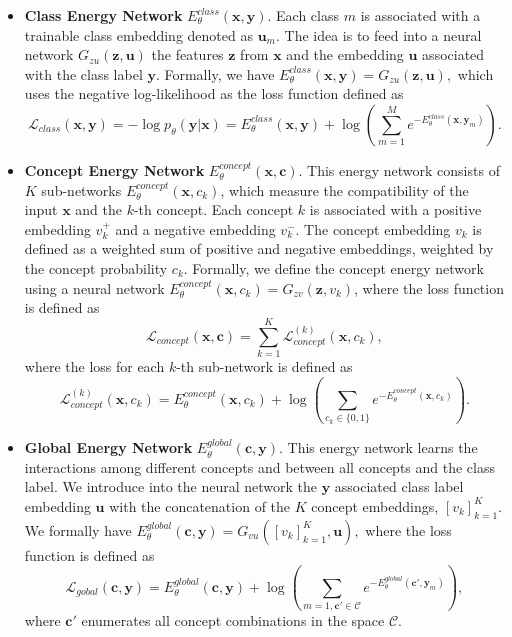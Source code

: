\begin{itemize}
    \item \textbf{Class Energy Network} $E_{\theta}^{class}(\mathbf{x},\mathbf{y})$. Each class $m$ is associated with a trainable class embedding denoted as $\mathbf{u}_m$. The idea is to feed into a neural network $G_{zu}(\mathbf{z},\mathbf{u})$ the features $\mathbf{z}$ from $\mathbf{x}$ and the embedding $\mathbf{u}$ associated with the class label $\mathbf{y}$. Formally, we have $E_{\theta}^{class}(\mathbf{x},\mathbf{y})=G_{zu}(\mathbf{z},\mathbf{u}),$ which uses the negative log-likelihood as the loss function defined as 
     \begin{equation}
         \mathcal{L}_{class}(\mathbf{x},\mathbf{y})=-\log p_{\theta}(\mathbf{y}|\mathbf{x})=E_{\theta}^{class}(\mathbf{x},\mathbf{y})+\log \left( \sum_{m=1}^M e^{-E_{\theta}^{class}(\mathbf{x},\mathbf{y}_m)} \right).
     \end{equation}
    \item \textbf{Concept Energy Network} $E_{\theta}^{concept}(\mathbf{x},\mathbf{c})$. This energy network consists of $K$ sub-networks $E_{\theta}^{concept}(\mathbf{x},c_k)$, which measure the compatibility of the input $\mathbf{x}$ and the $k$-th concept. Each concept $k$ is associated with a positive embedding $v_k^+$ and a negative embedding $v_k^-$. The concept embedding $v_k$ is defined as a weighted sum of positive and negative embeddings, weighted by the concept probability $c_k$. Formally, we define the concept energy network using a neural network $E_{\theta}^{concept}(\mathbf{x},c_k)=G_{zv}(\mathbf{z},v_k)$, where the loss function is defined as 
    \begin{equation}
        \mathcal{L}_{concept}(\mathbf{x},\mathbf{c})=\sum_{k=1}^K \mathcal{L}^{(k)}_{concept}(\mathbf{x},c_k),
    \end{equation}
    where the loss for each $k$-th sub-network is defined as 
    \begin{equation}
        \mathcal{L}^{(k)}_{concept}(\mathbf{x},c_k) = E_{\theta}^{concept}(\mathbf{x},c_k) + \log \left( \sum_{c_k\in\{0,1\}} e^{-E_{\theta}^{concept}(\mathbf{x},c_k)} \right).
    \end{equation}
    \item \textbf{Global Energy Network} $E_{\theta}^{global}(\mathbf{c},\mathbf{y})$. This energy network learns the interactions among different concepts and between all concepts and the class label. We introduce into the neural network the $\mathbf{y}$ associated class label embedding $\mathbf{u}$ with the concatenation of the $K$ concept embeddings, $[v_k]_{k=1}^K$. We formally have $E_{\theta}^{global}(\mathbf{c},\mathbf{y})=G_{vu}([v_k]_{k=1}^K,\mathbf{u}),$ where the loss function is defined as 
    \begin{equation}
        \mathcal{L}_{gobal}(\mathbf{c},\mathbf{y})=E_{\theta}^{global}(\mathbf{c},\mathbf{y}) + \log \left( \sum_{m=1,\mathbf{c}'\in\mathcal{C}} e^{-E_{\theta}^{global}(\mathbf{c}',\mathbf{y}_m)} \right),
    \end{equation}
    where $\mathbf{c}'$ enumerates all concept combinations in the space $\mathcal{C}$.  
\end{itemize}




